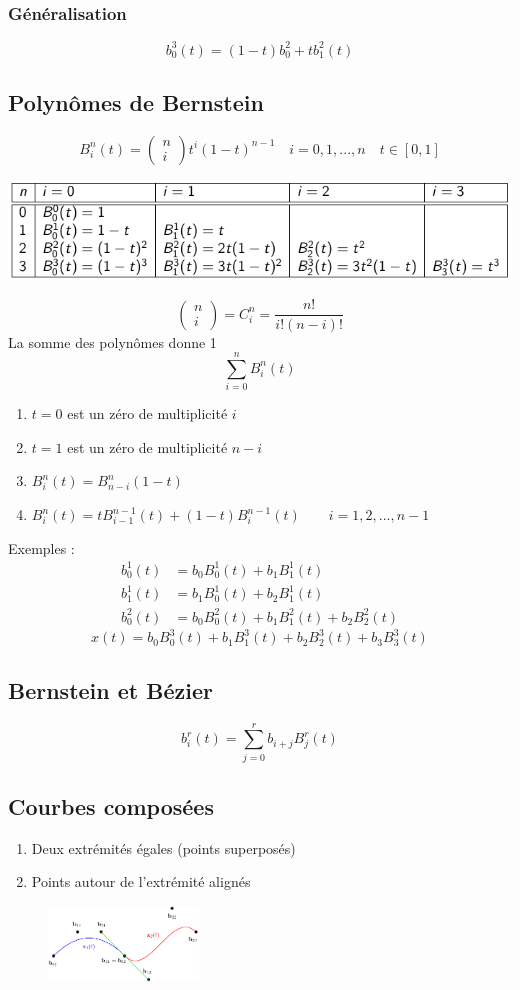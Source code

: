 \documentclass[resume]{subfiles}
\begin{document}
\subsubsection{Généralisation}
$$b_{0}^{3}(t)=(1-t)b_{0}^{2}+tb_1^{2}(t)$$

	\subsection{Polynômes de Bernstein}
	$$\boxed{B_i^n(t)=\begin{pmatrix}
	n\\i
	\end{pmatrix}t^{i}(1-t)^{n-1}\quad i=0,1,...,n\quad t\in[0,1]}$$
	\begin{center}
	\includegraphics[width=0.8\columnwidth]{img_21.pdf}
	\end{center}
	$$\begin{pmatrix}
	n\\i
	\end{pmatrix}=C_{i}^{n}=\frac{n!}{i!(n-i)!}$$
	La somme des polynômes donne 1
	$$\sum_{i=0}^{n}B_{i}^{n}(t)$$
	\begin{enumerate}
	\item $t=0$ est un zéro de multiplicité $i$
	\item $t=1$ est un zéro de multiplicité $n-i$
	\item $B_{i}^{n}(t)=B_{n-i}^{n}(1-t)$
	\item $B_{i}^{n}(t)=tB_{i-1}^{n-1}(t)+(1-t)B_{i}^{n-1}(t)\qquad i=1,2,...,n-1$
	\end{enumerate}
	Exemples :
	\begin{align*}
	b_0^1(t)&=b_0B_{0}^{1}(t)+b_1B_1^1(t)\\
	b_1^1(t)&=b_1B_0^1(t)+b_2B_1^1(t)\\
	b_0^2(t)&=b_0B_0^2(t)+b_1B_1^2(t)+b_2B_2^2(t)
	\end{align*}
	$$\boxed{x(t)=b_0B_0^3(t)+b_1B_1^3(t)+b_2B_2^3(t)+b_3B_3^3(t)}$$
	\subsection{Bernstein et Bézier}
	$$b_i^r(t)=\sum_{j=0}^{r}b_{i+j}B_j^r(t)$$
	\subsection{Courbes composées}
\begin{enumerate}
\item Deux extrémités égales (points superposés)
\item Points autour de l'extrémité alignés
\end{enumerate}
\begin{figure}[H]
\centering
\includegraphics[width=4cm]{img_0.pdf}
\end{figure}



    
\end{document}
